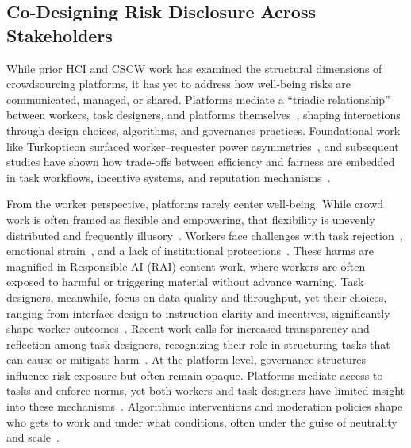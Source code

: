 \subsection{Co-Designing Risk Disclosure Across Stakeholders}
While prior HCI and CSCW work has examined the structural dimensions of crowdsourcing platforms, it has yet to address how well-being risks are communicated, managed, or shared. Platforms mediate a “triadic relationship” between workers, task designers, and platforms themselves~\cite{fieseler_unfairness_2019}, shaping interactions through design choices, algorithms, and governance practices. Foundational work like Turkopticon surfaced worker–requester power asymmetries~\cite{irani2013turkopticon}, and subsequent studies have shown how trade-offs between efficiency and fairness are embedded in task workflows, incentive systems, and reputation mechanisms~\cite{ho2015incentivizing, saito2019turkscanner}.

From the worker perspective, platforms rarely center well-being. While crowd work is often framed as flexible and empowering, that flexibility is unevenly distributed and frequently illusory~\cite{rechkemmer2022understanding, varanasi2022feeling, liang2021embracing}. Workers face challenges with task rejection~\cite{mcinnis2016taking}, emotional strain~\cite{flores2020challenges, martin2014being}, and a lack of institutional protections~\cite{salehi2018ink, silberman2018responsible}. These harms are magnified in Responsible AI (RAI) content work, where workers are often exposed to harmful or triggering material without advance warning.
Task designers, meanwhile, focus on data quality and throughput, yet their choices, ranging from interface design to instruction clarity and incentives, significantly shape worker outcomes~\cite{wu2017confusing, han2020crowd, ho2015incentivizing}. Recent work calls for increased transparency and reflection among task designers, recognizing their role in structuring tasks that can cause or mitigate harm~\cite{zheng2011task, bragg2018sprout, qian2025locating, sutherland2018sharing}.
At the platform level, governance structures influence risk exposure but often remain opaque. Platforms mediate access to tasks and enforce norms, yet both workers and task designers have limited insight into these mechanisms~\cite{toxtli2021quantifying, whiting2019fair, gray2016crowd}. Algorithmic interventions and moderation policies shape who gets to work and under what conditions, often under the guise of neutrality and scale~\cite{gadiraju2017modus, rzeszotarski2012crowdscape}.

